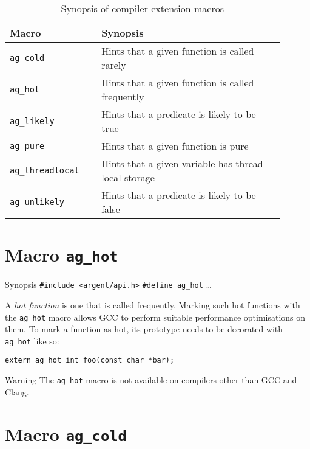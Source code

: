 \renewcommand\arraystretch{1.1}
\begin{table}[!htbp]
\centering
\small
\begin{tabular}[t]{>{\centering}m{0.3\linewidth}
    >{\raggedright\arraybackslash}m{0.6\linewidth}}
\toprule
\textbf{Macro} & \textbf{Synopsis} \\
\midrule
\texttt{ag\_cold} & Hints that a given function is called rarely \\
\texttt{ag\_hot} & Hints that a given function is called frequently \\
\texttt{ag\_likely} & Hints that a predicate is likely to be true \\
\texttt{ag\_pure} & Hints that a given function is pure \\
\texttt{ag\_threadlocal} & Hints that a given variable has thread local 
    storage \\
\texttt{ag\_unlikely} & Hints that a predicate is likely to be false \\
\bottomrule
\end{tabular}
\caption{Synopsis of compiler extension macros}
\label{tab:synopsis}
\end{table}


\section{Macro \texttt{ag\_hot}}

\begin{bclogo}[logo=\bccrayon, noborder=true, barre=snake, couleurBarre=gray]
    {Synopsis}
  \verb|#include <argent/api.h>|
  \verb|#define ag_hot| \ldots
\end{bclogo}

A \emph{hot function} is one that is called frequently. Marking such hot
functions with the \verb|ag_hot| macro allows GCC to perform suitable
performance optimisations on them. To mark a function as hot, its prototype
needs to be decorated with \verb|ag_hot| like so:
\begin{lstlisting}[linewidth=1.0\linewidth]
extern ag_hot int foo(const char *bar);
\end{lstlisting}

\begin{bclogo}[logo=\bctakecare, noborder=true, couleurBarre=orange]{Warning}
  The \verb|ag_hot| macro is not available on compilers other than GCC and 
  Clang.
\end{bclogo}


\section{Macro \texttt{ag\_cold}}

